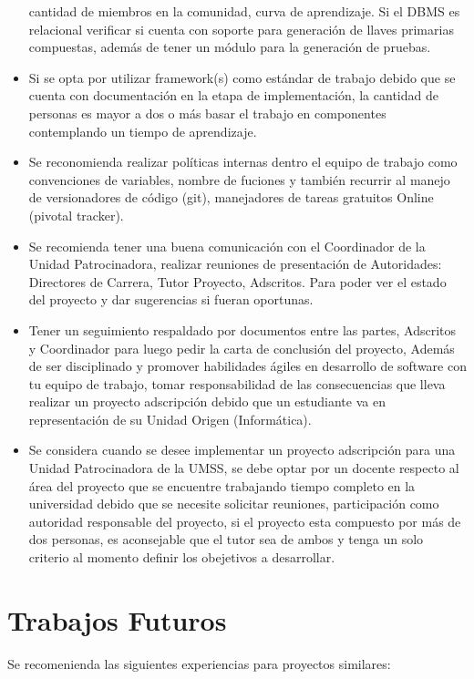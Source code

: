\begin{itemize}
cantidad de miembros en la comunidad, curva de aprendizaje. Si el DBMS es 
relacional verificar si cuenta con soporte para generaci\'{o}n de llaves 
primarias compuestas, adem\'{a}s de tener un m\'{o}dulo para la 
generaci\'{o}n de pruebas.
\item Si se opta por utilizar framework(s) como est\'{a}ndar de trabajo debido
que se cuenta con documentaci\'{o}n en la etapa de implementaci\'{o}n, la 
cantidad de personas es mayor a dos o m\'{a}s basar el trabajo en componentes
contemplando un tiempo de aprendizaje.
\item Se reconomienda realizar pol\'{i}ticas internas dentro el equipo de 
trabajo como convenciones de variables, nombre de fuciones y tambi\'{e}n 
recurrir al manejo de versionadores de c\'{o}digo (git), manejadores de tareas
gratuitos Online (pivotal tracker).
\item Se recomienda tener una buena comunicaci\'{o}n con el Coordinador de la
Unidad Patrocinadora, realizar reuniones de presentaci\'{o}n
de Autoridades: Directores de Carrera, Tutor Proyecto, Adscritos. Para poder 
ver el estado del proyecto y dar sugerencias si fueran oportunas.
\item Tener un seguimiento respaldado por documentos entre las partes, Adscritos
y Coordinador para luego pedir la carta de conclusi\'{o}n del proyecto, Adem\'{a}s
de ser disciplinado y promover habilidades \'{a}giles en desarrollo de software con tu
equipo de trabajo, tomar responsabilidad de las consecuencias que lleva realizar un
proyecto adscripci\'{o}n debido que un estudiante va en representaci\'{o}n de su
Unidad Origen (Inform\'{a}tica).
\item Se considera cuando se desee implementar un proyecto adscripci\'{o}n para 
una Unidad 
Patrocinadora de la UMSS, se debe optar por un docente respecto al \'{a}rea
del proyecto que se encuentre trabajando tiempo completo en la universidad debido
que se necesite solicitar reuniones, participaci\'{o}n como autoridad responsable
del proyecto, si el proyecto esta compuesto por m\'{a}s de dos personas, es 
aconsejable que el tutor sea de ambos y tenga un solo criterio al momento 
definir los obejetivos a desarrollar.

\end{itemize}

\section{Trabajos Futuros}

Se recomenienda las siguientes experiencias para proyectos similares:

